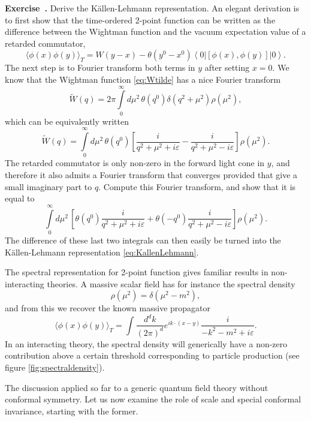 \documentclass[a4paper,12pt]{article}
\newcommand{\ket}[1]{\left| #1 \right\rangle}
\newcommand{\bra}[1]{\left\langle #1 \right|}
\numberwithin{equation}{section}
\newcounter{exercise}[section]
\newenvironment{exercise}[1][]%
	{\refstepcounter{exercise}\bigskip
	\begin{mdframed}[backgroundcolor=gray!20, linewidth=0]
	\noindent\textbf{Exercise~\thesection.\theexercise #1} \rmfamily}
  	{\end{mdframed}\bigskip}
\begin{document}
\begin{exercise}
	Derive the Källen-Lehmann representation.
	An elegant derivation is to first show that the 
	time-ordered 2-point function can be written as the difference
	between the Wightman function and the vacuum expectation value
	of a retarded commutator,
	$$
	\langle \phi(x) \phi(y) \rangle_T
	= 
	W(y - x)
	- \theta(y^0 - x^0)
	\bra{0} \left[ \phi(x), \phi(y) \right] \ket{0}.
	$$
	The next step is to Fourier transform both terms in $y$
	after setting $x = 0$.
	We know that the Wightman function \eqref{eq:Wtilde}
	has a nice Fourier transform
	$$
		\widetilde{W}(q)
		= 2\pi \int\limits_0^\infty d\mu^2 \,
		\theta(q^0) 
		\delta(q^2 + \mu^2) \rho(\mu^2),
	$$
	which can be equivalently written
	$$
		\widetilde{W}(q)
		= \int\limits_0^\infty d\mu^2 \,
		\theta(q^0) 
		\left[ \frac{i}{q^2 + \mu^2 + i \varepsilon}
		- \frac{i}{q^2 + \mu^2 - i \varepsilon} \right] \rho(\mu^2).
	$$
	The retarded commutator is only non-zero in the forward light cone
	in $y$, and therefore it also admits a Fourier transform
	that converges provided that give a small imaginary part to $q$.
	Compute this Fourier transform, and show that it is equal to
	$$
		\int\limits_0^\infty d\mu^2 \,
		\left[ \theta(q^0) \frac{i}{q^2 + \mu^2 + i \varepsilon}
		+ \theta(-q^0) \frac{i}{q^2 + \mu^2 - i \varepsilon}
		\right] \rho(\mu^2).
	$$
	The difference of these last two integrals can then easily be
	turned into the Källen-Lehmann representation
	\eqref{eq:KallenLehmann}.
\end{exercise}
%
The spectral representation for 2-point function gives familiar results in non-interacting theories. A massive scalar field has for instance the spectral density
\begin{equation}
	\rho(\mu^2) = \delta(\mu^2 - m^2),
\end{equation}
and from this we recover the known massive propagator
\begin{equation}
	\langle \phi(x) \phi(y) \rangle_T
	= \int \frac{d^dk}{(2\pi)^d}
	e^{i k \cdot (x - y)}
	\frac{i}
	{-k^2 - m^2 + i \varepsilon}.
\end{equation}
In an interacting theory, the spectral density will generically have a non-zero contribution above a certain threshold corresponding to particle production (see figure \ref{fig:spectraldensity}).

The discussion applied so far to a generic quantum field theory without conformal symmetry. Let us now examine the role of scale and special conformal invariance, starting with the former.
\end{document}
